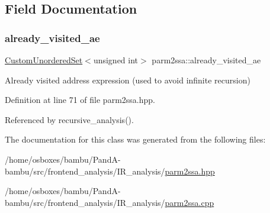 \subsection{Field Documentation}
\mbox{\label{classparm2ssa_aa34aab725ce5a54255507b9da590cef5}} 
\subsubsection{\texorpdfstring{already\+\_\+visited\+\_\+ae}{already\_visited\_ae}}
{\footnotesize\ttfamily \hyperlink{classCustomUnorderedSet}{Custom\+Unordered\+Set}$<$unsigned int$>$ parm2ssa\+::already\+\_\+visited\+\_\+ae\hspace{0.3cm}{\ttfamily [protected]}}



Already visited address expression (used to avoid infinite recursion) 



Definition at line 71 of file parm2ssa.\+hpp.



Referenced by recursive\+\_\+analysis().



The documentation for this class was generated from the following files\+:\begin{DoxyCompactItemize}
\item 
/home/osboxes/bambu/\+Pand\+A-\/bambu/src/frontend\+\_\+analysis/\+I\+R\+\_\+analysis/\hyperlink{parm2ssa_8hpp}{parm2ssa.\+hpp}\item 
/home/osboxes/bambu/\+Pand\+A-\/bambu/src/frontend\+\_\+analysis/\+I\+R\+\_\+analysis/\hyperlink{parm2ssa_8cpp}{parm2ssa.\+cpp}\end{DoxyCompactItemize}
